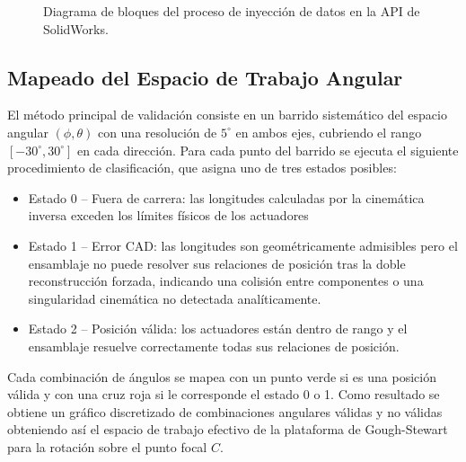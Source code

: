 \begin{figure}[htbp]
    \caption{Diagrama de bloques del proceso de inyección de datos en la
    API de SolidWorks.}
    \label{fig:inyeccion-solidworks}
\end{figure}

\subsection{Mapeado del Espacio de Trabajo Angular}

El método principal de validación consiste en un barrido sistemático del espacio angular $(\phi, \theta)$ con una resolución de $5^{\circ}$ en ambos ejes, cubriendo el rango $[-30^{\circ},30^{\circ}]$ en cada dirección. Para cada punto del barrido se ejecuta el siguiente procedimiento de clasificación, que asigna uno de tres estados posibles:

\begin{itemize}

	\item {Estado 0 – Fuera de carrera:} las longitudes calculadas por la cinemática inversa exceden los límites físicos de los actuadores
	
	\item{Estado 1 – Error CAD: las longitudes son geométricamente admisibles pero el ensamblaje no puede resolver sus relaciones de posición tras la doble reconstrucción forzada, indicando una colisión entre componentes o una singularidad cinemática no detectada analíticamente.}
	
	\item{Estado 2 – Posición válida: los actuadores están dentro de rango y el ensamblaje resuelve correctamente todas sus relaciones de posición.}
	
\end{itemize}

Cada combinación de ángulos se mapea con un punto verde si es una posición válida y con una cruz roja si le corresponde el estado 0 o 1. Como resultado se obtiene un gráfico discretizado de combinaciones angulares válidas y no válidas obteniendo así el espacio de trabajo efectivo de la plataforma de Gough-Stewart para la rotación sobre el punto focal $C$.

